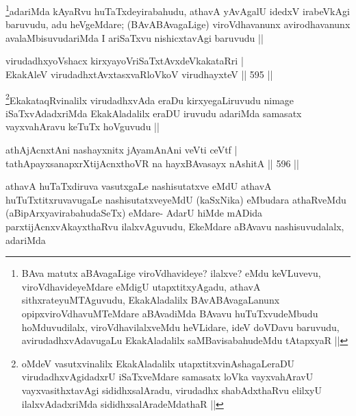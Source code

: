 \begin{artha}
\footnote{BAva matutx aBAvagaLige viroVdhavideye? ilalxve? eMdu keVLuvevu, viroVdhavideyeMdare eMdigU utapxtitxyAgadu, athavA sithxrateyuMTAguvudu, EkakAladalilx BAvABAvagaLanunx opipxviroVdhavuMTeMdare aBAvadiMda BAvavu huTuTxvudeMbudu hoMduvudilalx, viroVdhavilalxveMdu heVLidare, ideV doVDavu baruvudu, avirudadhxvAdavugaLu EkakAladalilx saMBavisabahudeMdu tAtapxyaR ||}adariMda kAyaRvu huTaTxdeyirabahudu, athavA yAvAgalU idedxV irabeVkAgi baruvudu, adu heVgeMdare; (BAvABAvagaLige) viroVdhavanunx avirodhavanunx avalaMbisuvudariMda I ariSaTxvu nishicxtavAgi baruvudu ||
\end{artha}


\begin{shl}
virudadhxyoVshacx kirxyayoVriSaTxtAvxdeVkakataRri | \\
EkakAleV virudadhxtAvxtasxvaRloVkoV virudhayxteV \hfill||  595 ||  
\end{shl}

\begin{artha}
\footnote{oMdeV vasutxvinalilx EkakAladalilx utapxtitxvinAshagaLeraDU virudadhxvAgidadxrU iSaTxveMdare samasatx loVka vayxvahAravU vayxvasithxtavAgi sididhxsalAradu, virudadhx shabAdxthaRvu elilxyU ilalxvAdadxriMda sididhxsalAradeMdathaR ||}EkakataqRvinalilx virudadhxvAda eraDu kirxyegaLiruvudu nimage iSaTxvAdadxriMda EkakAladalilx eraDU iruvudu adariMda samasatx vayxvahAravu keTuTx hoVguvudu ||
\end{artha}


\begin{shl}
athAjAcnxtAni nashayxnitx jAyamAnAni veVti ceVtf | \\
tathA\s payxsanapxrXtijAcnxthoVR na hayxBAvasayx nAshitA \hfill||  596 ||  
\end{shl}

\begin{artha}
athavA huTaTxdiruva vasutxgaLe nashisutatxve eMdU athavA huTuTxtitxruvavugaLe nashisutatxveyeMdU (kaSxNika) eMbudara athaRveMdu (aBipArxyavirabahudaSeTx) eMdare- AdarU hiMde mADida parxtijAcnxvAkayxthaRvu ilalxvAguvudu, EkeMdare aBAvavu nashisuvudalalx, adariMda
\end{artha}


